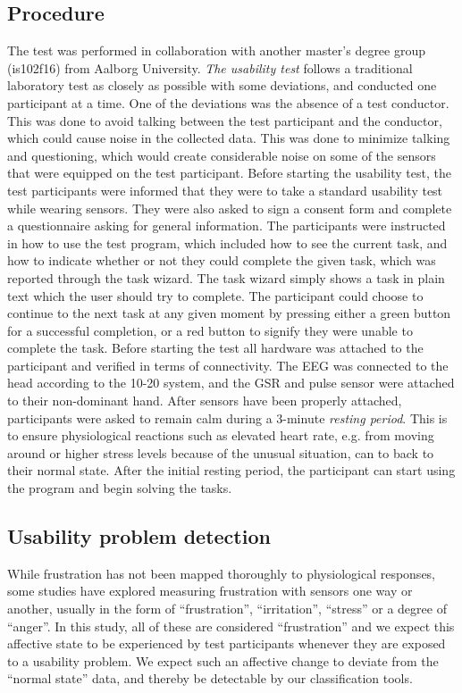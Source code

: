 \subsection{Procedure}
The test was performed in collaboration with another master's degree group (is102f16) from Aalborg University.
\textit{The usability test} follows a traditional laboratory test as closely as possible with some deviations, and conducted one participant at a time. 
One of the deviations was the absence of a test conductor. This was done to avoid talking between the test participant and the conductor, which could cause noise in the collected data. 
This was done to minimize talking and questioning, which would create considerable noise on some of the sensors that were equipped on the test participant.
Before starting the usability test, the test participants were informed that they were to take a standard usability test while wearing sensors.
They were also asked to sign a consent form and complete a questionnaire asking for general information.  
The participants were instructed in how to use the test program, which included how to see the current task, and how to indicate whether or not they could complete the given task, which was reported through the task wizard. 
The task wizard simply shows a task in plain text which the user should try to complete. The participant could choose to continue to the next task at any given moment by pressing either a green button for a successful completion, or a red button to signify they were unable to complete the task. 
Before starting the test all hardware was attached to the participant and verified in terms of connectivity. 
The EEG was connected to the head according to the 10-20 system\cite{eeg_tech_10_20}, and the GSR and pulse sensor were attached to their non-dominant hand.
After sensors have been properly attached, participants were asked to remain calm during a 3-minute \textit{resting period}. 
This is to ensure physiological reactions such as elevated heart rate, e.g. from moving around or higher stress levels because of the unusual situation, can to back to their normal state. 
After the initial resting period, the participant can start using the program and begin solving the tasks. 

\subsection{Usability problem detection}
While frustration has not been mapped thoroughly to physiological responses, some studies have explored measuring
frustration with sensors one way or another, usually in the form of ``frustration'', ``irritation'', ``stress'' or a
degree of ``anger''. 
In this study, all of these are considered ``frustration'' and we expect this affective state to be
experienced by test participants whenever they are exposed to a usability problem. We expect such an affective change
to deviate from the ``normal state'' data, and thereby be detectable by our classification tools.

